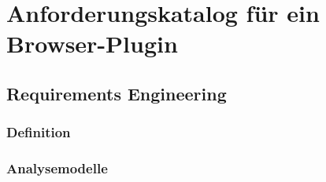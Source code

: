
\chapter{Anforderungskatalog für ein Browser-Plugin}
\label{chp:Anforderungskatalog}

\section{Requirements Engineering}
\label{sec:Anforderungskatalog:req}


\subsection{Definition}
\label{sec:Anforderungskatalog:req:definition}

\subsection{Analysemodelle}
\label{sec:Anforderungskatalog:req:modelle}%

